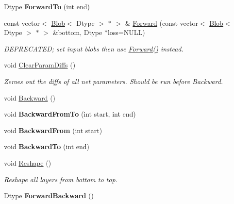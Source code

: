 \begin{DoxyCompactItemize}
\item 
Dtype {\bfseries Forward\+To} (int end)\hypertarget{classcaffe_1_1Net_a9e78782abd9080626ad13daac3abf896}{}\label{classcaffe_1_1Net_a9e78782abd9080626ad13daac3abf896}

\item 
const vector$<$ \hyperlink{classcaffe_1_1Blob}{Blob}$<$ Dtype $>$ $\ast$ $>$ \& \hyperlink{classcaffe_1_1Net_ad12d1ab8e1beb2e407e82454b174f83a}{Forward} (const vector$<$ \hyperlink{classcaffe_1_1Blob}{Blob}$<$ Dtype $>$ $\ast$ $>$ \&bottom, Dtype $\ast$loss=N\+U\+LL)\hypertarget{classcaffe_1_1Net_ad12d1ab8e1beb2e407e82454b174f83a}{}\label{classcaffe_1_1Net_ad12d1ab8e1beb2e407e82454b174f83a}

\begin{DoxyCompactList}\small\item\em D\+E\+P\+R\+E\+C\+A\+T\+ED; set input blobs then use \hyperlink{classcaffe_1_1Net_a6f6cf9d40637f7576828d856bb1b1826}{Forward()} instead. \end{DoxyCompactList}\item 
void \hyperlink{classcaffe_1_1Net_a3d251c397f812a6d8e162db3a82bb198}{Clear\+Param\+Diffs} ()\hypertarget{classcaffe_1_1Net_a3d251c397f812a6d8e162db3a82bb198}{}\label{classcaffe_1_1Net_a3d251c397f812a6d8e162db3a82bb198}

\begin{DoxyCompactList}\small\item\em Zeroes out the diffs of all net parameters. Should be run before Backward. \end{DoxyCompactList}\item 
void \hyperlink{classcaffe_1_1Net_a7a1a6d17347106dd1284b1b6d28cb4e9}{Backward} ()
\item 
void {\bfseries Backward\+From\+To} (int start, int end)\hypertarget{classcaffe_1_1Net_a4cbe2e5f4bdde638fb16568b629526dd}{}\label{classcaffe_1_1Net_a4cbe2e5f4bdde638fb16568b629526dd}

\item 
void {\bfseries Backward\+From} (int start)\hypertarget{classcaffe_1_1Net_a36843d26a781f42df9ac5852187df03b}{}\label{classcaffe_1_1Net_a36843d26a781f42df9ac5852187df03b}

\item 
void {\bfseries Backward\+To} (int end)\hypertarget{classcaffe_1_1Net_a1c2d3c2909120250cc29cc98401e39d8}{}\label{classcaffe_1_1Net_a1c2d3c2909120250cc29cc98401e39d8}

\item 
void \hyperlink{classcaffe_1_1Net_a8417af82aa83be45d39aab735bdead1d}{Reshape} ()
\begin{DoxyCompactList}\small\item\em Reshape all layers from bottom to top. \end{DoxyCompactList}\item 
Dtype {\bfseries Forward\+Backward} ()\hypertarget{classcaffe_1_1Net_a3ff72974f0f1ba2edc2cb0f76fd41b56}{}\label{classcaffe_1_1Net_a3ff72974f0f1ba2edc2cb0f76fd41b56}


\end{DoxyCompactItemize}

